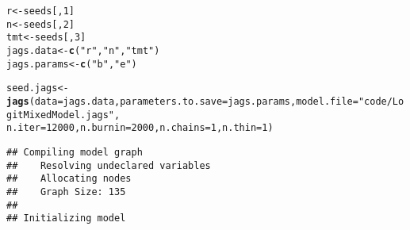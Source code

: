 \documentclass[12pt,letterpaper,oneside]{article}\usepackage{graphicx, color}
\makeatletter
\newcommand{\hlfunctioncall}[1]{\textcolor[rgb]{0.501960784313725,0,0.329411764705882}{\textbf{#1}}}%
\newcommand{\hlstring}[1]{\textcolor[rgb]{0.6,0.6,1}{#1}}%
\newenvironment{kframe}{%
 \def\at@end@of@kframe{}%
 \ifinner\ifhmode%
  \def\at@end@of@kframe{\end{minipage}}%
  \begin{minipage}{\columnwidth}%
 \fi\fi%
 \def\FrameCommand##1{\hskip\@totalleftmargin \hskip-\fboxsep
 \colorbox{shadecolor}{##1}\hskip-\fboxsep
     \hskip-\linewidth \hskip-\@totalleftmargin \hskip\columnwidth}%
 \MakeFramed {\advance\hsize-\width
   \@totalleftmargin\z@ \linewidth\hsize
   \@setminipage}}%
 {\par\unskip\endMakeFramed%
 \at@end@of@kframe}
\newenvironment{knitrout}{}{} %
\makeatother
\begin{document}
\begin{knitrout}\scriptsize
{}\color{fgcolor}\begin{kframe}
\begin{alltt}
r <- seeds[, 1]
n <- seeds[, 2]
tmt <- seeds[, 3]
jags.data <- \hlfunctioncall{c}(\hlstring{"r"}, \hlstring{"n"}, \hlstring{"tmt"})
jags.params <- \hlfunctioncall{c}(\hlstring{"b"}, \hlstring{"e"})

seed.jags <- \hlfunctioncall{jags}(data = jags.data, parameters.to.save = jags.params, model.file = \hlstring{"code/LogitMixedModel.jags"}, 
    n.iter = 12000, n.burnin = 2000, n.chains = 1, n.thin = 1)
\end{alltt}


{\ttfamily\noindent\itshape\color{messagecolor}{\#\# module glm loaded}}\begin{verbatim}
## Compiling model graph
##    Resolving undeclared variables
##    Allocating nodes
##    Graph Size: 135
## 
## Initializing model
\end{verbatim}
\begin{alltt}


\end{alltt}
\end{kframe}
\end{knitrout}
\end{document}

